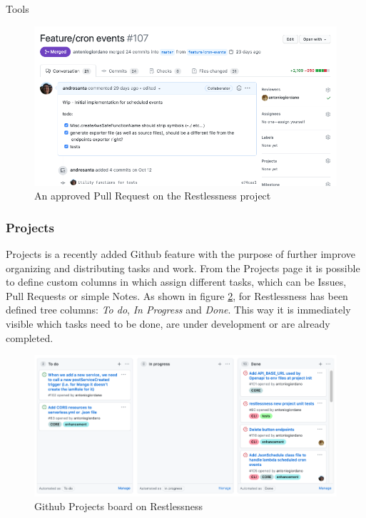 \begin{chapter}{Tools}
    \begin{figure}
        \centering
        \includegraphics[width=\linewidth]{source/images/rln-pull-request.png}
        \caption{An approved Pull Request on the Restlessness project}
        \label{fig:rln_pull_request}
    \end{figure}

    \subsubsection{Projects}
    Projects is a recently added Github feature with the purpose of further improve
    organizing and distributing tasks and work. From the Projects page it is possible
    to define custom columns in which assign different tasks, which can be Issues,
    Pull Requests or simple Notes. As shown in figure \ref{fig:rln_project_board},
    for Restlessness has been defined tree columns: \textit{To do},
    \textit{In Progress} and \textit{Done}. This way it is immediately visible which
    tasks need to be done, are under development or are already completed.

    \begin{figure}
        \centering
        \includegraphics[width=\linewidth]{source/images/rln-github-project-board.png}
        \caption{Github Projects board on Restlessness}
        \label{fig:rln_project_board}
    \end{figure}


\end{chapter}

